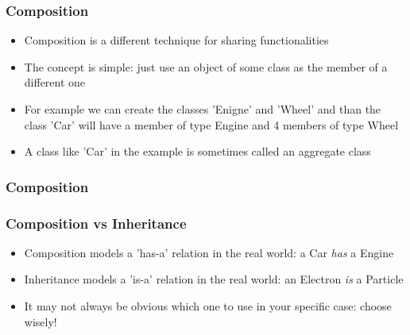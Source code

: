 \documentclass[9pt]{beamer}
\begin{document}
\begin{frame}
  \frametitle{Composition}
    
  \begin{itemize}
    \item \alert{Composition} is a different technique for sharing functionalities
    \medskip
    \item The concept is simple: just use an object of some class as the member of a different one
    \medskip
    \item For example we can create the classes 'Enigne' and 'Wheel' and than the class 'Car' will have
          a member of type Engine and 4 members of type Wheel
    \medskip
    \item A class like 'Car' in the example is sometimes called an \alert{aggregate} class
  \end{itemize}
  
\end{frame}


\begin{frame}
  \frametitle{Composition}
  
\end{frame}


\begin{frame}
  \frametitle{Composition vs Inheritance}
    
  \begin{itemize}
    \item Composition models a \alert{'has-a'} relation in the real world: a Car \emph{has} a Engine
    \medskip
    \item Inheritance models a \alert{'is-a'} relation in the real world: an Electron \emph{is} a Particle
    \medskip
    \item It may not always be obvious which one to use in your specific case: choose wisely!
  \end{itemize}
  
\end{frame}
\end{document}
